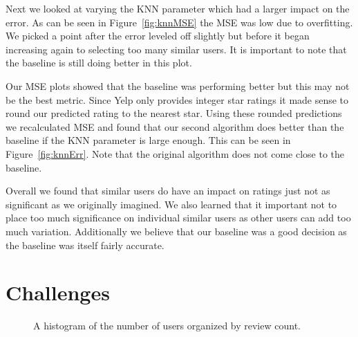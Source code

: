 \documentclass[10pt,twocolumn,letterpaper]{article}
\begin{document}
Next we looked at varying the KNN parameter which had a larger impact on the error. As can be seen in Figure~\ref{fig:knnMSE} the MSE was low due to overfitting. We picked a point after the error leveled off slightly but before it began increasing again to selecting too many similar users. It is important to note that the baseline is still doing better in this plot.

Our MSE plots showed that the baseline was performing better but this may not be the best metric. Since Yelp only provides integer star ratings it made sense to round our predicted rating to the nearest star. Using these rounded predictions we recalculated MSE and found that our second algorithm does better than the baseline if the KNN parameter is large enough. This can be seen in Figure~\ref{fig:knnErr}. Note that the original algorithm does not come close to the baseline.

Overall we found that similar users do have an impact on ratings just not as significant as we originally imagined. We also learned that it important not to place too much significance on individual similar users as other users can add too much variation. Additionally we believe that our baseline was a good decision as the baseline was itself fairly accurate. 


\section{Challenges}

\begin{figure}[t]
\begin{center}
\end{center}
   \caption{A histogram of the number of users organized by review count.}
\label{fig:usrCnt}
\end{figure}
\end{document}
